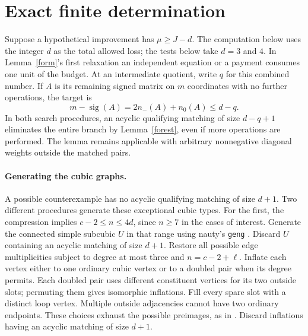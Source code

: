 \documentclass[11pt]{article}
\newcommand{\sig}{\operatorname{sig}}
\begin{document}
\section{Exact finite determination}\label{certificate}
Suppose a hypothetical improvement has $\mu\ge J-d$. The computation below uses the integer $d$ as the total allowed loss; the tests below take $d=3$ and $4$. In Lemma~\ref{form}'s first relaxation an independent equation or a payment consumes one unit of the budget. At an intermediate quotient, write $q$ for this combined number. If $A$ is its remaining signed matrix on $m$ coordinates with no further operations, the target is
\[
 m-\sig(A)=2n_-(A)+n_0(A)\le d-q.
\]
In both search procedures, an acyclic qualifying matching of size $d-q+1$ eliminates the entire branch by Lemma~\ref{forest}, even if more operations are performed. The lemma remains applicable with arbitrary nonnegative diagonal weights outside the matched pairs.

\paragraph{Generating the cubic graphs.} A possible counterexample has no acyclic qualifying matching of size $d+1$. Two different procedures generate these exceptional cubic types. For the first, the compression implies $c-2\le n\le4d$, since $n\ge7$ in the cases of interest. Generate the connected simple subcubic $U$ in that range using nauty's \texttt{geng} \cite{nauty}. Discard $U$ containing an acyclic matching of size $d+1$. Restore all possible edge multiplicities subject to degree at most three and $n=c-2+\ell$. Inflate each vertex either to one ordinary cubic vertex or to a doubled pair when its degree permits. Each doubled pair uses different constituent vertices for its two outside slots; permuting them gives isomorphic inflations. Fill every spare slot with a distinct loop vertex. Multiple outside adjacencies cannot have two ordinary endpoints. These choices exhaust the possible preimages, as in \cite{prev}. Discard inflations having an acyclic matching of size $d+1$.
\end{document}

